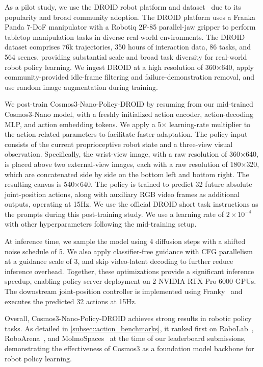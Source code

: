 As a pilot study, we use the DROID robot platform and dataset~\citep{khazatsky2024droid} due to its popularity and broad community adoption. The DROID platform uses a Franka Panda 7-DoF manipulator with a Robotiq 2F-85 parallel-jaw gripper to perform tabletop manipulation tasks in diverse real-world environments. The DROID dataset comprises 76k trajectories, 350 hours of interaction data, 86 tasks, and 564 scenes, providing substantial scale and broad task diversity for real-world robot policy learning. We ingest DROID at a high resolution of 360$\times$640, apply community-provided idle-frame filtering and failure-demonstration removal, and use random image augmentation during training.

We post-train Cosmos3-Nano-Policy-DROID by resuming from our mid-trained Cosmos3-Nano model, with a freshly initialized action encoder, action-decoding MLP, and action embedding tokens. We apply a 5$\times$ learning-rate multiplier to the action-related parameters to facilitate faster adaptation. The policy input consists of the current proprioceptive robot state and a three-view visual observation. Specifically, the wrist-view image, with a raw resolution of 360$\times$640, is placed above two external-view images, each with a raw resolution of 180$\times$320, which are concatenated side by side on the bottom left and bottom right. The resulting canvas is 540$\times$640. The policy is trained to predict 32 future absolute joint-position actions, along with auxiliary RGB video frames as additional outputs, operating at 15Hz. We use the official DROID short task instructions as the prompts during this post-training study. We use a learning rate of $2 \times 10^{-4}$ with other hyperparameters following the mid-training setup.

At inference time, we sample the model using 4 diffusion steps with a shifted noise schedule of 5. We also apply classifier-free guidance with CFG parallelism at a guidance scale of 3, and skip video-latent decoding to further reduce inference overhead. Together, these optimizations provide a significant inference speedup, enabling policy server deployment on 2 NVIDIA RTX Pro 6000 GPUs. The downstream joint-position controller is implemented using Franky~\citep{Schneider_franky_High-Level_Control} and executes the predicted 32 actions at 15Hz.

Overall, Cosmos3-Nano-Policy-DROID achieves strong results in robotic policy tasks. As detailed in \cref{subsec::action_benchmarks}, it ranked first on RoboLab~\citep{yang2026robolab}, RoboArena~\citep{atreya2025roboarena}, and MolmoSpaces~\citep{kim:arxiv2026} at the time of our leaderboard submissions, demonstrating the effectiveness of Cosmos3 as a foundation model backbone for robot policy learning.